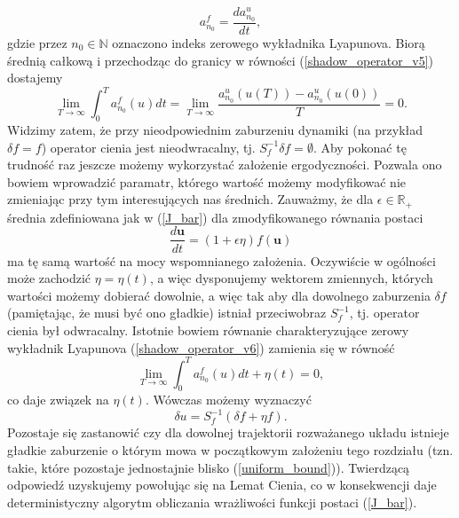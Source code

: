 \documentclass[12pt, twoside]{book}
\begin{document}
\begin{equation}
a^{f}_{n_{0}} = \frac{da^{u}_{n_{0}}}{dt},
\label{shadow_operator_v5}
\end{equation}
gdzie przez $ n_{0} \in \mathbb{N} $ oznaczono indeks zerowego wykładnika Lyapunova. Biorą średnią całkową i przechodząc do granicy w równości (\ref{shadow_operator_v5}) dostajemy
\begin{equation}
\lim\limits_{T\rightarrow \infty}\int_{0}^{T}a^{f}_{n_{0}}(u)dt = \lim\limits_{T\rightarrow \infty} \frac{a^{u}_{n_{0}}(u(T))-a^{u}_{n_{0}}(u(0))}{T} = 0.
\label{shadow_operator_v6}
\end{equation}
Widzimy zatem, że przy nieodpowiednim zaburzeniu dynamiki (na przykład $ \delta f = f $) operator cienia jest nieodwracalny, tj. $ S^{-1}_{f} \delta f = \emptyset$.\newline
Aby pokonać tę trudność raz jeszcze możemy wykorzystać założenie ergodyczności. Pozwala ono bowiem wprowadzić paramatr, którego wartość możemy modyfikować nie zmieniając przy tym interesujących nas średnich. Zauważmy, że dla $ \epsilon \in \mathbb{R}_{+} $  średnia zdefiniowana jak w (\ref{J_bar}) dla zmodyfikowanego równania postaci
\begin{equation}
\frac{d\textbf{u}}{dt} = (1 + \epsilon \eta)f(\textbf{u})
\end{equation}
ma tę samą wartość na mocy wspomnianego założenia. Oczywiście w ogólności może zachodzić $ \eta = \eta(t) $, a więc dysponujemy wektorem zmiennych, których wartości możemy dobierać dowolnie, a więc tak aby dla dowolnego zaburzenia $ \delta f$ (pamiętając, że musi być ono gładkie) istniał przeciwobraz $ S^{-1}_{f} $, tj. operator cienia był odwracalny. Istotnie bowiem równanie charakteryzujące zerowy wykładnik Lyapunova (\ref{shadow_operator_v6}) zamienia się w równość
\begin{equation}
\lim\limits_{T\rightarrow \infty}\int_{0}^{T}a^{f}_{n_{0}}(u)dt + \eta(t) = 0,
\end{equation}
co daje związek na $ \eta(t) $. Wówczas możemy wyznaczyć
\begin{equation}
\delta u = S^{-1}_{f}(\delta f + \eta f).
\label{shadow_operator_8}
\end{equation}
Pozostaje się zastanowić czy dla dowolnej trajektorii rozważanego układu istnieje gładkie zaburzenie o którym mowa w początkowym założeniu tego rozdziału (tzn. takie, które pozostaje jednostajnie blisko (\ref{uniform_bound})). Twierdzącą odpowiedź uzyskujemy powołując się na Lemat Cienia, co w konsekwencji daje deterministyczny algorytm obliczania wrażliwości funkcji postaci (\ref{J_bar}).
\end{document}
